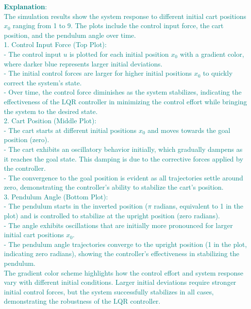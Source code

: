 \documentclass[a4 paper]{article}
\begin{document}
\textcolor{teal}{
\textbf{Explanation}: \\
The simulation results show the system response to different initial cart positions \( x_0 \) ranging from 1 to 9. 
The plots include the control input force, the cart position, and the pendulum angle over time. \\
1. Control Input Force (Top Plot): \\
    - The control input \( u \) is plotted for each initial position \( x_0 \) with a gradient color, where darker blue represents larger initial deviations. \\
    - The initial control forces are larger for higher initial positions \( x_0 \) to quickly correct the system's state. \\
    - Over time, the control force diminishes as the system stabilizes, indicating the effectiveness of the LQR controller in minimizing the control effort while bringing the system to the desired state. \\
2. Cart Position (Middle Plot): \\
    - The cart starts at different initial positions \( x_0 \) and moves towards the goal position (zero). \\
    - The cart exhibits an oscillatory behavior initially, which gradually dampens as it reaches the goal state. This damping is due to the corrective forces applied by the controller. \\
    - The convergence to the goal position is evident as all trajectories settle around zero, demonstrating the controller's ability to stabilize the cart's position. \\
3. Pendulum Angle (Bottom Plot): \\
    - The pendulum starts in the inverted position (\(\pi\) radians, equivalent to 1 in the plot) and is controlled to stabilize at the upright position (zero radians). \\
    - The angle exhibits oscillations that are initially more pronounced for larger initial cart positions \( x_0 \). \\
    - The pendulum angle trajectories converge to the upright position (1 in the plot, indicating zero radians), showing the controller's effectiveness in stabilizing the pendulum. \\
The gradient color scheme highlights how the control effort and system response vary with different initial conditions. Larger initial deviations require stronger initial control forces, 
but the system successfully stabilizes in all cases, demonstrating the robustness of the LQR controller.
}
\end{document}
